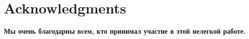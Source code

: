 \section{Acknowledgments}
\textbf{Мы очень благодарны всем, кто принимал участие в этой нелегкой работе.}


% 
% 

